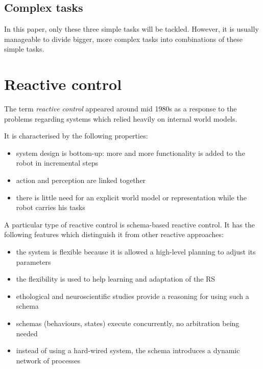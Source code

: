 \documentclass[12pt]{report}
\begin{document}
\section{Complex tasks}

In this paper, only these three simple tasks will be tackled. However, it is usually manageable to divide bigger, more complex tasks into combinations of these simple tasks.




\chapter{Reactive control}

The term \emph{reactive control} appeared around mid 1980s as a response to the problems regarding systems which relied heavily on internal world models. 

It is characterised by the following properties:

\begin{itemize}

\item  system design is bottom-up: more and more functionality is added to the robot in incremental steps

\item action and perception are linked together

\item there is little need for an explicit world model or representation while the robot carries his tasks

\end{itemize}

A particular type of reactive control is schema-based reactive control. It has the following features which distinguish it from other reactive approaches:

\begin{itemize}

\item the system is flexible because it is allowed a high-level planning to adjust its parameters

\item the flexibility is used to help learning and adaptation of the RS

\item ethological and neuroscientific studies provide a reasoning for using such a schema

\item schemas (behaviours, states) execute concurrently, no arbitration being needed

\item instead of using a hard-wired system, the schema introduces a dynamic network of processes

\end{itemize}
\end{document}
